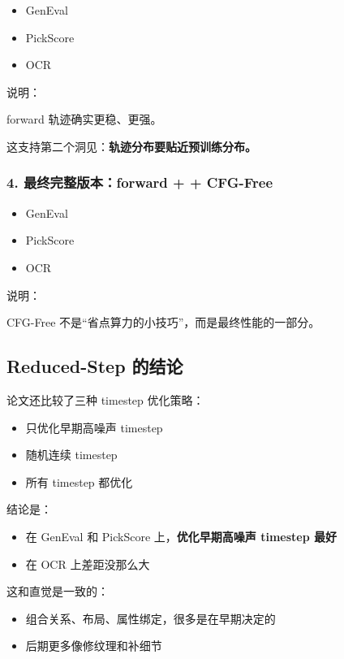 \begin{itemize}[leftmargin=1.5em]
  \item GenEval 
  \item PickScore 
  \item OCR 
\end{itemize}

说明：

forward 轨迹确实更稳、更强。

这支持第二个洞见：\textbf{轨迹分布要贴近预训练分布。}

\subsubsection{4. 最终完整版本：forward +  + CFG-Free}

\begin{itemize}[leftmargin=1.5em]
  \item GenEval 
  \item PickScore 
  \item OCR 
\end{itemize}

说明：

CFG-Free 不是“省点算力的小技巧”，而是最终性能的一部分。

\subsection{Reduced-Step 的结论}

论文还比较了三种 timestep 优化策略：

\begin{itemize}[leftmargin=1.5em]
  \item 只优化早期高噪声 timestep
  \item 随机连续 timestep
  \item 所有 timestep 都优化
\end{itemize}

结论是：

\begin{itemize}[leftmargin=1.5em]
  \item 在 GenEval 和 PickScore 上，\textbf{优化早期高噪声 timestep 最好}
  \item 在 OCR 上差距没那么大
\end{itemize}

这和直觉是一致的：

\begin{itemize}[leftmargin=1.5em]
  \item 组合关系、布局、属性绑定，很多是在早期决定的
  \item 后期更多像修纹理和补细节
\end{itemize}

